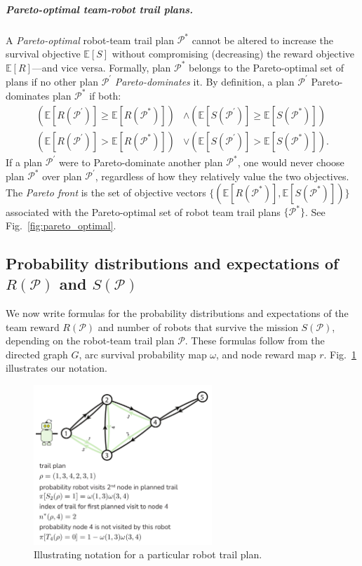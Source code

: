 \documentclass[11pt, oneside]{article}
\begin{document}
\subparagraph{Pareto-optimal team-robot trail plans.} 
A \emph{Pareto-optimal} \cite{pardalos2017non} robot-team trail plan $\mathcal{P}^*$ cannot be altered to increase the survival objective $\mathbb{E}[S]$ without compromising (decreasing) the reward objective $\mathbb{E}[R]$---and vice versa. 
Formally, plan $\mathcal{P}^*$ belongs to the Pareto-optimal set of plans if no other plan $\mathcal{P}^\prime$ \emph{Pareto-dominates} it. By definition, a plan $\mathcal{P}^\prime$ Pareto-dominates plan $\mathcal{P}^*$ if both:
\begin{align}
	\left (\mathbb{E}[R(\mathcal{P}^\prime)] \geq \mathbb{E}[R(\mathcal{P}^*)]  \right) & \wedge \left( \mathbb{E}[S(\mathcal{P}^\prime)] \geq \mathbb{E}[S(\mathcal{P}^*)] \right) \\
	\left( \mathbb{E}[R(\mathcal{P}^\prime)] > \mathbb{E}[R(\mathcal{P}^*)] \right) & \vee \left( \mathbb{E}[S(\mathcal{P}^\prime)] > \mathbb{E}[S(\mathcal{P}^*)] \right).
\end{align}
If a plan $\mathcal{P}^\prime$ were to Pareto-dominate another plan $\mathcal{P}^*$, one would never choose plan $\mathcal{P}^*$ over plan $\mathcal{P}^\prime$, regardless of how they relatively value the two objectives. The \emph{Pareto front} is the set of objective vectors $\{(\mathbb{E}[R(\mathcal{P}^*)], \mathbb{E}[S(\mathcal{P}^*)])\}$ associated with the Pareto-optimal set of robot team trail plans $\{\mathcal{P}^*\}$. See Fig.~\ref{fig:pareto_optimal}. 

\subsection{Probability distributions and expectations of $R(\mathcal{P})$ and $S(\mathcal{P})$}
We now write formulas for the probability distributions and expectations of the team reward $R(\mathcal{P})$ and number of robots that survive the mission $S(\mathcal{P})$, depending on the robot-team trail plan $\mathcal{P}$. 
These formulas follow from the directed graph $G$, arc survival probability map $\omega$, and node reward map $r$. Fig.~\ref{fig:notation} illustrates our notation.

\begin{figure}[h!]
    \centering
    	\includegraphics[width=0.6\textwidth]{drawings/notation_fig/notation.pdf}
    \caption{Illustrating notation for a particular robot trail plan.} \label{fig:notation}
\end{figure}
\end{document}
